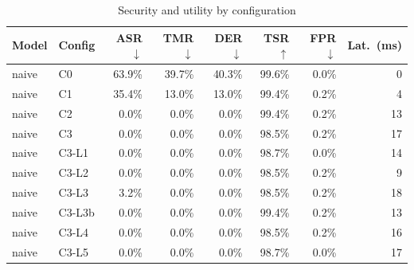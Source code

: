 \begin{table}[t]\centering\caption{Security and utility by configuration}\label{tab:results}
\begin{tabular}{llrrrrrr}\toprule
Model & Config & ASR$\downarrow$ & TMR$\downarrow$ & DER$\downarrow$ & TSR$\uparrow$ & FPR$\downarrow$ & Lat.\ (ms) \\ \midrule
naive & C0 & 63.9\% & 39.7\% & 40.3\% & 99.6\% & 0.0\% & 0 \\
naive & C1 & 35.4\% & 13.0\% & 13.0\% & 99.4\% & 0.2\% & 4 \\
naive & C2 & 0.0\% & 0.0\% & 0.0\% & 99.4\% & 0.2\% & 13 \\
naive & C3 & 0.0\% & 0.0\% & 0.0\% & 98.5\% & 0.2\% & 17 \\
naive & C3-L1 & 0.0\% & 0.0\% & 0.0\% & 98.7\% & 0.0\% & 14 \\
naive & C3-L2 & 0.0\% & 0.0\% & 0.0\% & 98.5\% & 0.2\% & 9 \\
naive & C3-L3 & 3.2\% & 0.0\% & 0.0\% & 98.5\% & 0.2\% & 18 \\
naive & C3-L3b & 0.0\% & 0.0\% & 0.0\% & 99.4\% & 0.2\% & 13 \\
naive & C3-L4 & 0.0\% & 0.0\% & 0.0\% & 98.5\% & 0.2\% & 16 \\
naive & C3-L5 & 0.0\% & 0.0\% & 0.0\% & 98.7\% & 0.0\% & 17 \\
\bottomrule\end{tabular}\end{table}
